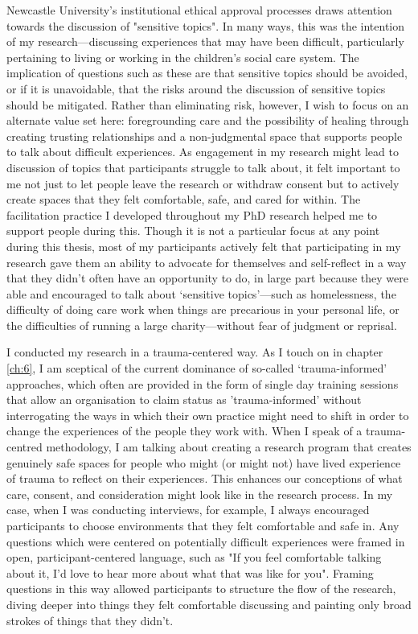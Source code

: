 Newcastle University’s institutional ethical approval processes draws attention towards the discussion of "sensitive topics". In many ways, this was the intention of my research—discussing experiences that may have been difficult, particularly pertaining to living or working in the children’s social care system. The implication of questions such as these are that sensitive topics should be avoided, or if it is unavoidable, that the risks around the discussion of sensitive topics should be mitigated. Rather than eliminating risk, however, I wish to focus on an alternate value set here: foregrounding care and the possibility of healing through creating trusting relationships and a non-judgmental space that supports people to talk about difficult experiences. As engagement in my research might lead to discussion of topics that participants struggle to talk about, it felt important to me not just to let people leave the research or withdraw consent but to actively create spaces that they felt comfortable, safe, and cared for within. The facilitation practice I developed throughout my PhD research helped me to support people during this. Though it is not a particular focus at any point during this thesis, most of my participants actively felt that participating in my research gave them an ability to advocate for themselves and self-reflect in a way that they didn’t often have an opportunity to do, in large part because they were able and encouraged to talk about ‘sensitive topics’—such as homelessness, the difficulty of doing care work when things are precarious in your personal life, or the difficulties of running a large charity—without fear of judgment or reprisal. 

I conducted my research in a trauma-centered way. As I touch on in chapter \ref{ch:6}, I am sceptical of the current dominance of so-called ‘trauma-informed’ approaches, which often are provided in the form of single day training sessions that allow an organisation to claim status as 'trauma-informed' without interrogating the ways in which their own practice might need to shift in order to change the experiences of the people they work with. When I speak of a trauma-centred methodology, I am talking about creating a research program that creates genuinely safe spaces for people who might (or might not) have lived experience of trauma to reflect on their experiences. This enhances our conceptions of what care, consent, and consideration might look like in the research process. In my case, when I was conducting interviews, for example, I always encouraged participants to choose environments that they felt comfortable and safe in. Any questions which were centered on potentially difficult experiences were framed in open, participant-centered language, such as "If you feel comfortable talking about it, I’d love to hear more about what that was like for you". Framing questions in this way allowed participants to structure the flow of the research, diving deeper into things they felt comfortable discussing and painting only broad strokes of things that they didn’t. 

